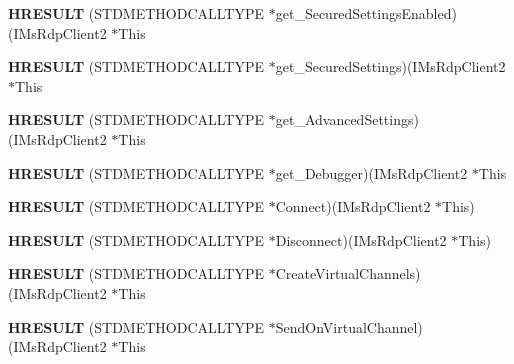 \begin{DoxyCompactItemize}
\mbox{\label{struct_i_ms_rdp_client2_vtbl_a19aa123dbbf388880cd91ac6879328e9}} 
{\bfseries H\+R\+E\+S\+U\+LT} (S\+T\+D\+M\+E\+T\+H\+O\+D\+C\+A\+L\+L\+T\+Y\+PE $\ast$get\+\_\+\+Secured\+Settings\+Enabled)(I\+Ms\+Rdp\+Client2 $\ast$This
\item 
\mbox{\label{struct_i_ms_rdp_client2_vtbl_a41bf978a9aed5f2df0021b37598b70bc}} 
{\bfseries H\+R\+E\+S\+U\+LT} (S\+T\+D\+M\+E\+T\+H\+O\+D\+C\+A\+L\+L\+T\+Y\+PE $\ast$get\+\_\+\+Secured\+Settings)(I\+Ms\+Rdp\+Client2 $\ast$This
\item 
\mbox{\label{struct_i_ms_rdp_client2_vtbl_ab83c9467e5ddc24ff7ff669640e9b66c}} 
{\bfseries H\+R\+E\+S\+U\+LT} (S\+T\+D\+M\+E\+T\+H\+O\+D\+C\+A\+L\+L\+T\+Y\+PE $\ast$get\+\_\+\+Advanced\+Settings)(I\+Ms\+Rdp\+Client2 $\ast$This
\item 
\mbox{\label{struct_i_ms_rdp_client2_vtbl_a6d5951208ce95feaceca593d7148aa07}} 
{\bfseries H\+R\+E\+S\+U\+LT} (S\+T\+D\+M\+E\+T\+H\+O\+D\+C\+A\+L\+L\+T\+Y\+PE $\ast$get\+\_\+\+Debugger)(I\+Ms\+Rdp\+Client2 $\ast$This
\item 
\mbox{\label{struct_i_ms_rdp_client2_vtbl_a7e24bdf436597280646d17f5e1845c6c}} 
{\bfseries H\+R\+E\+S\+U\+LT} (S\+T\+D\+M\+E\+T\+H\+O\+D\+C\+A\+L\+L\+T\+Y\+PE $\ast$Connect)(I\+Ms\+Rdp\+Client2 $\ast$This)
\item 
\mbox{\label{struct_i_ms_rdp_client2_vtbl_ae3f40ab7386eb82e678ea85e19fa28b7}} 
{\bfseries H\+R\+E\+S\+U\+LT} (S\+T\+D\+M\+E\+T\+H\+O\+D\+C\+A\+L\+L\+T\+Y\+PE $\ast$Disconnect)(I\+Ms\+Rdp\+Client2 $\ast$This)
\item 
\mbox{\label{struct_i_ms_rdp_client2_vtbl_aacf7f9e245f4e3f9dd38cefb7e68c257}} 
{\bfseries H\+R\+E\+S\+U\+LT} (S\+T\+D\+M\+E\+T\+H\+O\+D\+C\+A\+L\+L\+T\+Y\+PE $\ast$Create\+Virtual\+Channels)(I\+Ms\+Rdp\+Client2 $\ast$This
\item 
\mbox{\label{struct_i_ms_rdp_client2_vtbl_aa39160ac6dae150a6be768fdc2cd0968}} 
{\bfseries H\+R\+E\+S\+U\+LT} (S\+T\+D\+M\+E\+T\+H\+O\+D\+C\+A\+L\+L\+T\+Y\+PE $\ast$Send\+On\+Virtual\+Channel)(I\+Ms\+Rdp\+Client2 $\ast$This

\end{DoxyCompactItemize}
